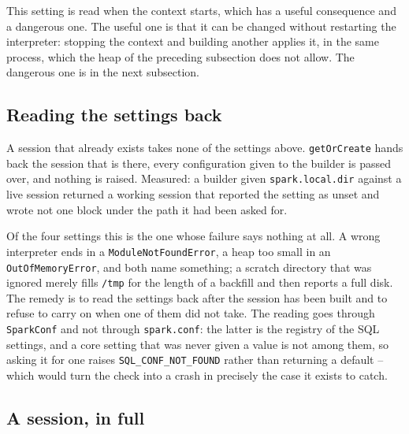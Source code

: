This setting is read when the context starts, which has a useful consequence and a dangerous one. The useful one is that it can be changed without restarting the interpreter: stopping the context and building another applies it, in the same process, which the heap of the preceding subsection does not allow. The dangerous one is in the next subsection.

\subsection{Reading the settings back}

A session that already exists takes none of the settings above. \verb|getOrCreate| hands back the session that is there, every configuration given to the builder is passed over, and nothing is raised. Measured: a builder given \verb|spark.local.dir| against a live session returned a working session that reported the setting as unset and wrote not one block under the path it had been asked for.

Of the four settings this is the one whose failure says nothing at all. A wrong interpreter ends in a \verb|ModuleNotFoundError|, a heap too small in an \verb|OutOfMemoryError|, and both name something; a scratch directory that was ignored merely fills \verb|/tmp| for the length of a backfill and then reports a full disk. The remedy is to read the settings back after the session has been built and to refuse to carry on when one of them did not take. The reading goes through \verb|SparkConf| and not through \verb|spark.conf|: the latter is the registry of the SQL settings, and a core setting that was never given a value is not among them, so asking it for one raises \verb|SQL_CONF_NOT_FOUND| rather than returning a default -- which would turn the check into a crash in precisely the case it exists to catch.

\subsection{A session, in full}

